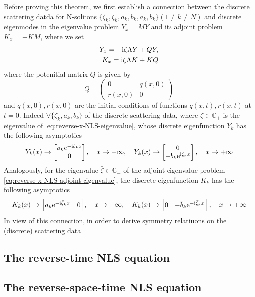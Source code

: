 Before proving this theorem, we first establish a connection between the discrete scattering datda for N-solitons $\{\zeta_{k}, \bar{\zeta_{k}}, a_{k}, b_{k}, \bar{a_{k}}, \bar{b_{k}}\}(1\neq k \neq N) $ and discrete eigenmodes in the eigenvalue problem $ Y_{x} = MY $ and its adjoint problem $ K_{x} = -KM $, where we set 
\begin{align}
    Y_{x} = - \mathrm{i} \zeta \Lambda Y + QY, \label{eq:reverse-x-NLS-eigenvalue}\\
    K_{x} = \mathrm{i} \zeta \Lambda K + KQ \label{eq:reverse-x-NLS-adjoint-eigenvalue}
\end{align}
where the potenitial matrix $ Q $ is given by
\begin{equation}
    Q = \begin{pmatrix}
        0 & q(x,0) \\
        r(x,0) & 0
    \end{pmatrix}
\end{equation} 
and $ q(x,0), r(x,0) $ are the initial conditions of functions $ q(x,t), r(x,t) $ at $ t = 0 $. Indeed $ \forall \{ \zeta_{k}, a_{k}, b_{k} \} $ of the discrete scattering data, where $ \zeta \in \mathbb{C_{+}} $ is the eigenvalue of \eqref{eq:reverse-x-NLS-eigenvalue}, whose discrete eigenfunction $ Y_{k} $ has the following asymptotics 
\begin{equation}
    Y_{k}(x) \to \begin{bmatrix} a_{k} \mathrm{e}^{-\mathrm{i} \zeta_{k} x} \\ 0 \end{bmatrix}, \quad x \to -\infty, \quad Y_{k}(x) \to \begin{bmatrix} 0 \\ -b_{k} \mathrm{e}^{\mathrm{i} \zeta_{k} x} \end{bmatrix}, \quad x \to +\infty
\end{equation}
Analogously, for the eigenvalue $ \bar{\zeta} \in \mathbb{C_{-}} $ of the adjoint eigenvalue problem \eqref{eq:reverse-x-NLS-adjoint-eigenvalue}, the discrete eigenfunction $ K_{k} $ has the following asymptotics 
\begin{equation}
    K_{k}(x) \to \begin{bmatrix} \bar{a}_{k} \mathrm{e}^{-\mathrm{i} \bar{\zeta}_{k} x} & 0 \end{bmatrix}, \quad x \to -\infty, \quad K_{k}(x) \to \begin{bmatrix} 0 & -\bar{b}_{k}\mathrm{e}^{-\mathrm{i} \bar{\zeta}_{k}x} \end{bmatrix}, \quad x \to +\infty
\end{equation}
In view of this connection, in order to derive symmetry relatiuons on the (discrete) scattering data
\subsection{The reverse-time NLS equation}
\subsection{The reverse-space-time NLS equation}